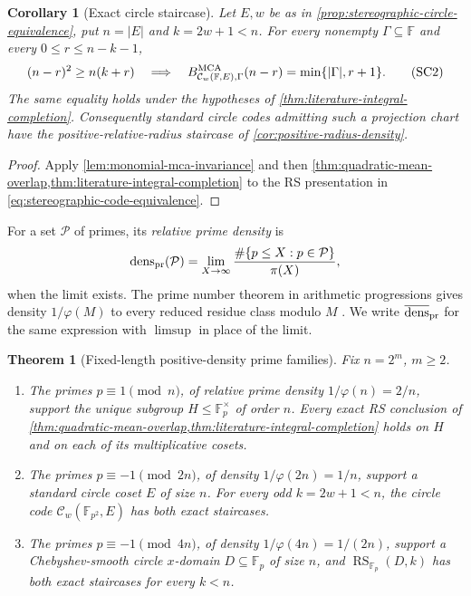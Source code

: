 \documentclass[11pt,a4paper]{amsart}
\numberwithin{equation}{section}
\newtheorem{theorem}{Theorem}[section]
\newtheorem{corollary}[corollary]{Corollary}
\theoremstyle{remark}
\DeclareMathOperator{\RS}{RS}
\newcommand{\F}{\mathbb F}
\newcommand{\Ccal}{\mathcal C}
\newcommand{\Pcal}{\mathcal P}
\newcommand{\abs}[1]{\lvert #1\rvert}
\begin{document}
\begin{corollary}[Exact circle staircase]
\label{cor:exact-circle-staircase}
Let \(E,w\) be as in \cref{prop:stereographic-circle-equivalence}, put
\(n=\abs E\) and \(k=2w+1<n\).  For every nonempty
\(\Gamma\subseteq\F\) and every \(0\le r\le n-k-1\),
\[
 (n-r)^2\ge n(k+r)
 \quad\Longrightarrow\quad
 B_{\Ccal_w(\F,E),\Gamma}^{\rm MCA}(n-r)
      =\min\{\abs\Gamma,r+1\}.                  \tag{SC2}
\]
The same equality holds under the hypotheses of
\cref{thm:literature-integral-completion}.  Consequently standard circle
codes admitting such a projection chart have the positive-relative-radius staircase of
\cref{cor:positive-radius-density}.
\end{corollary}

\begin{proof}
Apply \cref{lem:monomial-mca-invariance} and then
\cref{thm:quadratic-mean-overlap,thm:literature-integral-completion} to
the RS presentation in
\eqref{eq:stereographic-code-equivalence}.
\end{proof}

For a set \(\Pcal\) of primes, its \emph{relative prime density} is
\[
\operatorname{dens}_{\rm pr}(\Pcal)=
 \lim_{X\to\infty}\frac{\#\{p\le X:p\in\Pcal\}}{\pi(X)},
\]
when the limit exists.  The prime number theorem in arithmetic
progressions gives density \(1/\varphi(M)\) to every reduced residue
class modulo \(M\) \cite{Davenport}.
We write \(\overline{\operatorname{dens}}_{\rm pr}\) for the same
expression with \(\limsup\) in place of the limit.

\begin{theorem}[Fixed-length positive-density prime families]
\label{thm:fixed-length-prime-density}
Fix \(n=2^m\), \(m\ge2\).
\begin{enumerate}[label=\textup{(\alph*)},leftmargin=*]
\item The primes \(p\equiv1\pmod n\), of relative prime density
\(1/\varphi(n)=2/n\), support the unique subgroup
\(H\le\F_p^\times\) of order \(n\).  Every exact RS conclusion of
\cref{thm:quadratic-mean-overlap,thm:literature-integral-completion}
holds on \(H\) and on each of its multiplicative cosets.
\item The primes \(p\equiv-1\pmod {2n}\), of density
\(1/\varphi(2n)=1/n\), support a standard circle coset \(E\) of size
\(n\).  For every odd \(k=2w+1<n\), the circle code
\(\Ccal_w(\F_{p^2},E)\) has both exact staircases.
\item The primes \(p\equiv-1\pmod {4n}\), of density
\(1/\varphi(4n)=1/(2n)\), support a Chebyshev-smooth circle
\(x\)-domain \(D\subseteq\F_p\) of size \(n\), and
\(\RS_{\F_p}(D,k)\) has both exact staircases for every \(k<n\).
\end{enumerate}
\end{theorem}
\end{document}
